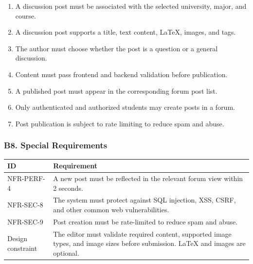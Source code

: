 \documentclass[12pt]{article}
\renewcommand{\baselinestretch}{1.5}
\begin{document}
\begin{enumerate}
\item A discussion post must be associated with the selected university, major, and course.
\item A discussion post supports a title, text content, LaTeX, images, and tags.
\item The author must choose whether the post is a question or a general discussion.
\item Content must pass frontend and backend validation before publication.
\item A published post must appear in the corresponding forum post list.
\item Only authenticated and authorized students may create posts in a forum.
\item Post publication is subject to rate limiting to reduce spam and abuse.
\end{enumerate}
\par\medskip

\hypertarget{sec:b8-special-requirements}{}
\subsubsection*{B8. Special Requirements}
\par\medskip

\begingroup
\small
\renewcommand{\baselinestretch}{1.0}\selectfont
\renewcommand{\arraystretch}{1.15}
\setlength{\tabcolsep}{6pt}
\begin{longtable}{|>{\raggedright\arraybackslash}p{}|>{\raggedright\arraybackslash}p{}|}
\hline
\textbf{ID} & \textbf{Requirement} \\ \hline
\endhead
NFR-PERF-4 & A new post must be reflected in the relevant forum view within 2 seconds. \\ \hline
NFR-SEC-8 & The system must protect against SQL injection, XSS, CSRF, and other common web vulnerabilities. \\ \hline
NFR-SEC-9 & Post creation must be rate-limited to reduce spam and abuse. \\ \hline
Design constraint & The editor must validate required content, supported image types, and image sizes before submission. LaTeX and images are optional. \\ \hline
\end{longtable}
\endgroup
\par\medskip
\end{document}
